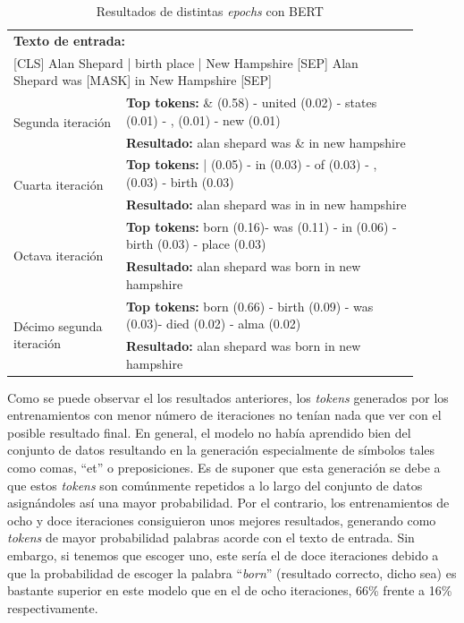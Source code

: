 \begin{table}[h!]
    \begin{center}
    \begin{tabular}{p{0.25\linewidth} | p{0.65\linewidth}}
    \multicolumn{2}{p{0.9\linewidth}}{\textbf{Texto de entrada:}} \\ 
    \multicolumn{2}{p{0.9\linewidth}}{[CLS] Alan Shepard | birth place | New Hampshire [SEP] Alan Shepard was [MASK] in New Hampshire [SEP]} \\ \hline

    \multirow{2}{*}{Segunda iteración} 
    &\textbf{Top tokens:} \& (0.58) - united (0.02) - states (0.01) - , (0.01) - new (0.01) \\ 
    &\textbf{Resultado:} alan shepard was \& in new hampshire \\ \hline
    
    \multirow{2}{*}{Cuarta iteración} 
    &\textbf{Top tokens:} | (0.05) - in (0.03) - of (0.03) - , (0.03) - birth (0.03) \\ 
    &\textbf{Resultado:} alan shepard was in in new hampshire \\ \hline
    
    \multirow{2}{*}{Octava iteración} 
    &\textbf{Top tokens:} born (0.16)- was (0.11) - in (0.06) - birth (0.03) - place (0.03) \\ 
    &\textbf{Resultado:} alan shepard was born in new hampshire \\ \hline
    
    \multirow{2}{30mm}{Décimo segunda iteración} 
    &\textbf{Top tokens:} born (0.66) - birth (0.09) - was (0.03)- died (0.02) - alma (0.02) \\ 
    &\textbf{Resultado:} alan shepard was born in new hampshire \\ \hline
    
    \end{tabular}
    \caption{Resultados de distintas \textit{epochs} con BERT}
    \label{tab:webnlg_bert_resultados}
    \end{center}
\end{table}


Como se puede observar el los resultados anteriores, los \textit{tokens} generados por los entrenamientos con menor número de iteraciones no tenían nada que ver con el posible resultado final. En general, el modelo no había aprendido bien del conjunto de datos resultando en la generación especialmente de símbolos tales como comas, ``et'' o preposiciones. Es de suponer que esta generación se debe a que estos \textit{tokens} son comúnmente repetidos a lo largo del conjunto de datos asignándoles así una mayor probabilidad. Por el contrario, los entrenamientos de ocho y doce iteraciones consiguieron unos mejores resultados, generando como \textit{tokens} de mayor probabilidad palabras acorde con el texto de entrada. Sin embargo, si tenemos que escoger uno, este sería el de doce iteraciones debido a que la probabilidad de escoger la palabra ``\textit{born}'' (resultado correcto, dicho sea) es bastante superior en este modelo que en el de ocho iteraciones, 66\% frente a 16\% respectivamente.


